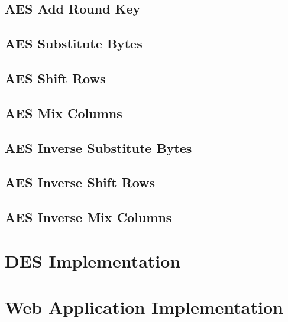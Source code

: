 \subsection{AES Add Round Key}


\subsection{AES Substitute Bytes}


\subsection{AES Shift Rows}


\subsection{AES Mix Columns}


\subsection{AES Inverse Substitute Bytes}


\subsection{AES Inverse Shift Rows}


\subsection{AES Inverse Mix Columns}


\section{DES Implementation}

\section{Web Application Implementation}

